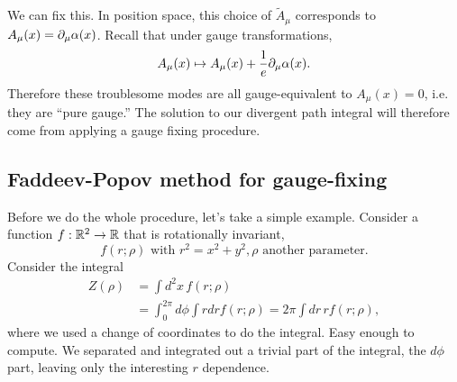 We can fix this. In position space, this choice of $\tilde A_\mu$ corresponds to $A_\mu(x)=\partial_\mu\alpha(x)$.
Recall that under gauge transformations,
\begin{equation}
    A_\mu(x)\mapsto A_\mu(x) +\frac{1}{e} \partial_\mu \alpha(x).
\end{equation}
Therefore these troublesome modes are all gauge-equivalent to $A_\mu(x)=0$, i.e. they are ``pure gauge.'' The solution to our divergent path integral will therefore come from applying a gauge fixing procedure.

\subsection*{Faddeev-Popov method for gauge-fixing} 
Before we do the whole procedure, let's take a simple example. Consider a function $f:\mathbb{R}^2\to \mathbb{R}$ that is rotationally invariant,
\begin{equation}
    f(r;\rho)\text{ with }r^2=x^2+y^2,\rho\text{ another parameter}.
\end{equation}
Consider the integral
\begin{align*}
    Z(\rho)&=\int d^2x\, f(r;\rho)\\
        &= \int_0^{2\pi} d\phi \int rdr f(r;\rho) =2\pi \int dr\, r f(r;\rho),
\end{align*}
where we used a change of coordinates to do the integral. Easy enough to compute. We separated and integrated out a trivial part of the integral, the $d\phi$ part, leaving only the interesting $r$ dependence.

